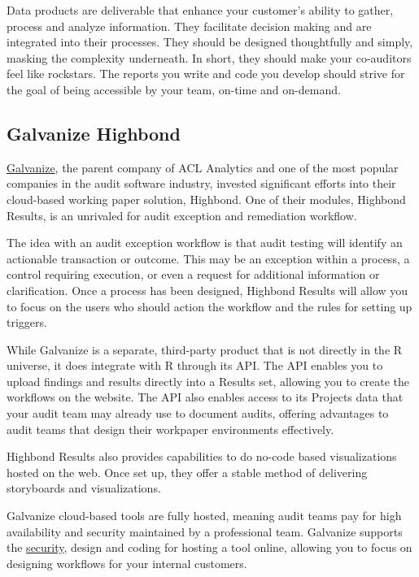 \documentclass[
]{book}
\begin{document}
Data products are deliverable that enhance your customer's ability to gather, process and analyze information. They facilitate decision making and are integrated into their processes. They should be designed thoughtfully and simply, masking the complexity underneath. In short, they should make your co-auditors feel like rockstars. The reports you write and code you develop should strive for the goal of being accessible by your team, on-time and on-demand.

\hypertarget{galvanize-highbond}{%
\subsection{Galvanize Highbond}\label{galvanize-highbond}}

\href{https://www.wegalvanize.com}{Galvanize}, the parent company of ACL Analytics and one of the most popular companies in the audit software industry, invested significant efforts into their cloud-based working paper solution, Highbond. One of their modules, Highbond Results, is an unrivaled for audit exception and remediation workflow.

The idea with an audit exception workflow is that audit testing will identify an actionable transaction or outcome. This may be an exception within a process, a control requiring execution, or even a request for additional information or clarification. Once a process has been designed, Highbond Results will allow you to focus on the users who should action the workflow and the rules for setting up triggers.

While Galvanize is a separate, third-party product that is not directly in the R universe, it does integrate with R through its API. The API enables you to upload findings and results directly into a Results set, allowing you to create the workflows on the website. The API also enables access to its Projects data that your audit team may already use to document audits, offering advantages to audit teams that design their workpaper environments effectively.

Highbond Results also provides capabilities to do no-code based visualizations hosted on the web. Once set up, they offer a stable method of delivering storyboards and visualizations.

Galvanize cloud-based tools are fully hosted, meaning audit teams pay for high availability and security maintained by a professional team. Galvanize supports the \href{https://www.wegalvanize.com/trust/}{security}, design and coding for hosting a tool online, allowing you to focus on designing workflows for your internal customers.
\end{document}

